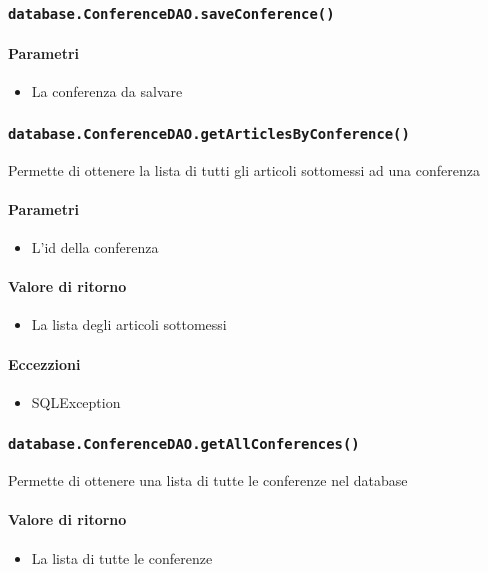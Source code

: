 \subsubsection{\texttt{database.ConferenceDAO.saveConference()}}
\paragraph{Parametri}
\begin{itemize}
\item La conferenza da salvare
\end{itemize}

\subsubsection{\texttt{database.ConferenceDAO.getArticlesByConference()}}
Permette di ottenere la lista di tutti gli articoli sottomessi ad una conferenza
\paragraph{Parametri}
\begin{itemize}
\item L'id della conferenza
\end{itemize}
\paragraph{Valore di ritorno}
\begin{itemize}
\item La lista degli articoli sottomessi
\end{itemize}
\paragraph{Eccezzioni}
\begin{itemize}
  \item SQLException
\end{itemize}

\subsubsection{\texttt{database.ConferenceDAO.getAllConferences()}}
Permette di ottenere una lista di tutte le conferenze nel database
\paragraph{Valore di ritorno}
\begin{itemize}
\item La lista di tutte le conferenze
\end{itemize}
